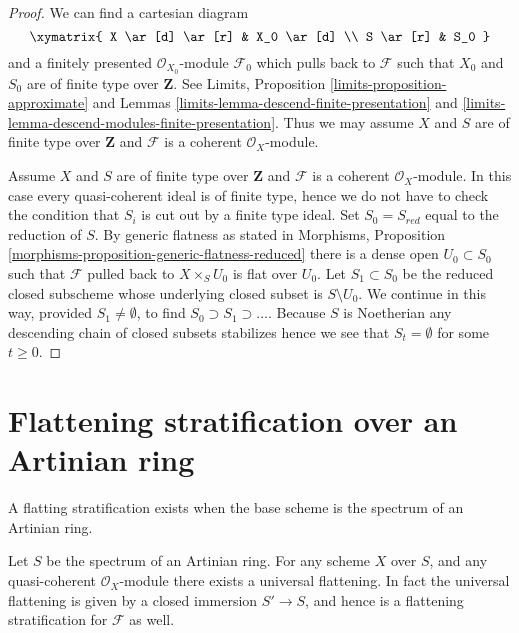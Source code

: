 \begin{proof}
We can find a cartesian diagram
$$
\xymatrix{
X \ar[d] \ar[r] & X_0 \ar[d] \\
S \ar[r] & S_0
}
$$
and a finitely presented $\mathcal{O}_{X_0}$-module $\mathcal{F}_0$
which pulls back to $\mathcal{F}$ such that $X_0$ and $S_0$ are of
finite type over $\mathbf{Z}$. See
Limits, Proposition \ref{limits-proposition-approximate} and
Lemmas \ref{limits-lemma-descend-finite-presentation} and
\ref{limits-lemma-descend-modules-finite-presentation}.
Thus we may assume $X$ and $S$ are of finite type over $\mathbf{Z}$
and $\mathcal{F}$ is a coherent $\mathcal{O}_X$-module.

\medskip\noindent
Assume $X$ and $S$ are of finite type over $\mathbf{Z}$
and $\mathcal{F}$ is a coherent $\mathcal{O}_X$-module.
In this case every quasi-coherent ideal is of finite type, hence
we do not have to check the condition that $S_i$ is cut out
by a finite type ideal. Set $S_0 = S_{red}$ equal to the reduction of $S$.
By generic flatness as stated in Morphisms, Proposition
\ref{morphisms-proposition-generic-flatness-reduced}
there is a dense open $U_0 \subset S_0$ such that $\mathcal{F}$
pulled back to $X \times_S U_0$ is flat over $U_0$.
Let $S_1 \subset S_0$ be the reduced closed subscheme whose
underlying closed subset is $S \setminus U_0$. We continue in this
way, provided $S_1 \not = \emptyset$, to find
$S_0 \supset S_1 \supset \ldots$. Because $S$
is Noetherian any descending chain of closed subsets stabilizes
hence we see that $S_t = \emptyset$ for some $t \geq 0$.
\end{proof}




\section{Flattening stratification over an Artinian ring}
\label{section-flattening-artinian}

\noindent
A flatting stratification exists when the base scheme is the spectrum
of an Artinian ring.

\begin{lemma}
\label{lemma-flattening-stratification-artinian}
Let $S$ be the spectrum of an Artinian ring.
For any scheme $X$ over $S$, and any quasi-coherent $\mathcal{O}_X$-module
there exists a universal flattening. In fact the universal flattening
is given by a closed immersion $S' \to S$, and hence is a flattening
stratification for $\mathcal{F}$ as well.
\end{lemma}

